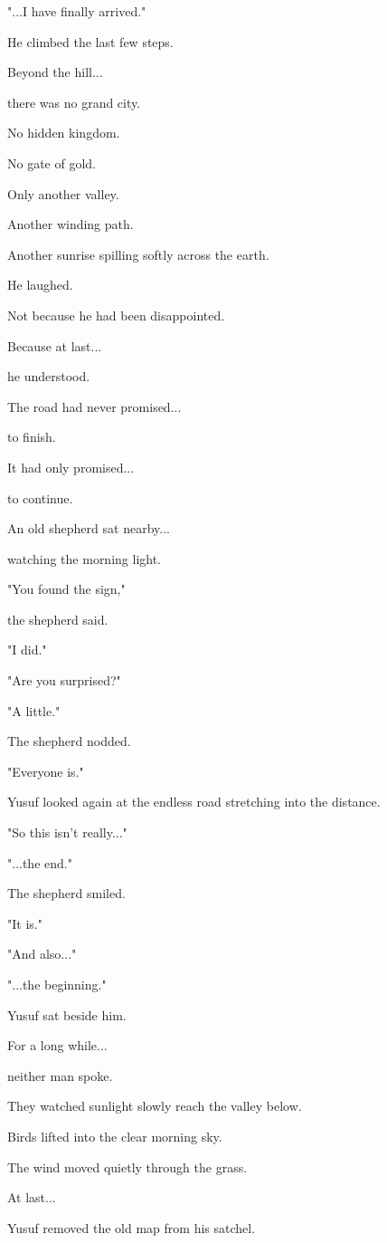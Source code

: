 \documentclass[12pt,openany]{book}
\begin{document}
"...I have finally arrived."

He climbed the last few steps.

Beyond the hill...

there was no grand city.

No hidden kingdom.

No gate of gold.

Only another valley.

Another winding path.

Another sunrise spilling softly across the earth.

He laughed.

Not because he had been disappointed.

Because at last...

he understood.

The road had never promised...

to finish.

It had only promised...

to continue.

An old shepherd sat nearby...

watching the morning light.

"You found the sign,"

the shepherd said.

"I did."

"Are you surprised?"

"A little."

The shepherd nodded.

"Everyone is."

Yusuf looked again at the endless road stretching into the distance.

"So this isn't really..."

"...the end."

The shepherd smiled.

"It is."

"And also..."

"...the beginning."

Yusuf sat beside him.

For a long while...

neither man spoke.

They watched sunlight slowly reach the valley below.

Birds lifted into the clear morning sky.

The wind moved quietly through the grass.

At last...

Yusuf removed the old map from his satchel.
\end{document}

